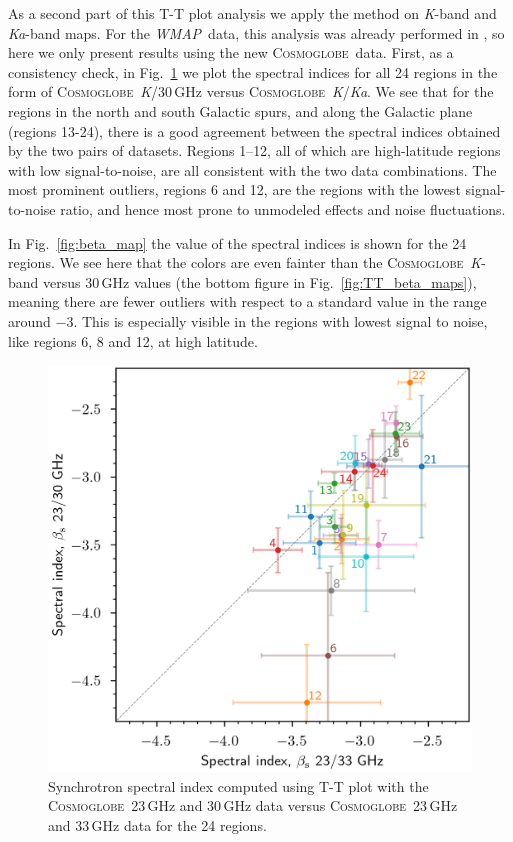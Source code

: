 \documentclass[twocolumn]{../../common/aa}
\def\wmap{\emph{WMAP}}
\newcommand{\cosmoglobe}{\textsc{Cosmoglobe}}
\newcommand{\Cosmoglobe}{\textsc{Cosmoglobe}}
\newcommand{\K}[0]{\textit K}
\newcommand{\Ka}[0]{\textit{Ka}}
\begin{document}
As a second part of this T-T plot analysis we apply the method on \K-band and \Ka-band maps. For the \wmap\ data, this analysis was already performed in  \citet{fuskeland2014}, so here we only present results using the new \cosmoglobe\ data. First, as a consistency check, in Fig.~\ref{fig:cos30_xyplot} we plot the spectral indices for all 24 regions in the form of \cosmoglobe\ \K/30\,GHz versus \cosmoglobe\ \K/\Ka. We see that for the regions in the north and south Galactic spurs, and along the Galactic plane (regions 13-24), there is a good agreement between the spectral indices obtained by the two pairs of datasets. Regions 1--12, all of which are high-latitude regions with low signal-to-noise, are all consistent with the two data combinations. The most prominent outliers, regions 6 and 12, are the regions with the lowest signal-to-noise ratio, and hence most prone to unmodeled effects and noise fluctuations.

In Fig.~\ref{fig:beta_map} the value of the spectral indices is shown for the 24 regions. We see here that the colors are even fainter than the \cosmoglobe\ \K-band versus 30\,GHz values (the bottom figure in Fig.~\ref{fig:TT_beta_maps}), meaning there are fewer outliers with respect to a standard value in the range around $-3$. This is especially visible in the regions with lowest signal to noise, like regions 6, 8 and 12, at high latitude.


\begin{figure}
        \centering
        \includegraphics[width=\linewidth]{figures/xy_regions.png}
        \caption{
Synchrotron spectral index computed using T-T plot with the \Cosmoglobe\ 23\,GHz and 30\,GHz data versus \Cosmoglobe\ 23\,GHz and 33\,GHz data for the 24 regions.}
        \label{fig:cos30_xyplot}
\end{figure}
\end{document}
